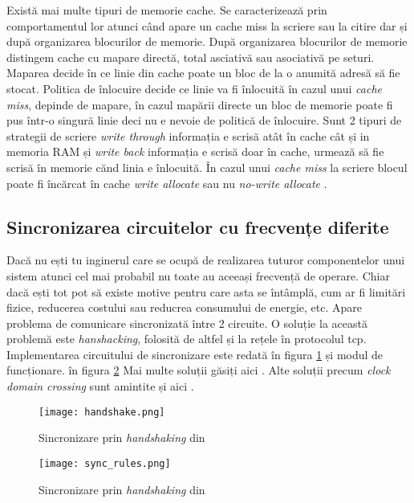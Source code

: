 \documentclass[../main.tex]{subfiles}
\begin{document}
Există mai multe tipuri de memorie cache. Se caracterizează prin comportamentul lor atunci când apare un cache miss la scriere
sau la citire dar și după organizarea blocurilor de memorie. După organizarea blocurilor de memorie distingem cache cu
mapare directă, total asciativă sau asociativă pe seturi. Maparea decide în ce linie din cache poate un bloc de la o anumită 
adresă să fie stocat. Politica de înlocuire decide ce linie va fi înlocuită în cazul unui \emph{cache miss}, depinde de
mapare, în cazul mapării directe un bloc de memorie poate fi pus într-o singură linie deci nu e nevoie de politică de
înlocuire. Sunt 2 tipuri de strategii de scriere \emph{write through} informația e scrisă atât în cache cât și in memoria RAM
și \emph{write back} informația e scrisă doar în cache, urmează să fie scrisă în memorie cănd linia e înlocuită. În cazul unui
\emph{cache miss} la scriere blocul poate fi încărcat în cache \emph{write allocate} sau nu \emph{no-write allocate}
\cite{cache}.

\subsection{Sincronizarea circuitelor cu frecvențe diferite}
Dacă nu ești tu inginerul care se ocupă de realizarea tuturor componentelor unui sistem atunci cel mai probabil nu toate
au aceeași frecvență de operare. Chiar dacă ești tot pot să existe motive pentru care asta se întâmplă, cum ar fi
limitări fizice, reducerea costului sau reducrea consumului de energie, etc. Apare problema de comunicare sincronizată
între 2 circuite. O soluție la această problemă este \emph{hanshacking}, folosită de altfel și la rețele în protocolul
\acrshort{tcp}. Implementarea circuitului de sincronizare este redată în figura \ref{fig:handshake} și modul de funcționare.
în figura \ref{fig:handshake_rules} Mai multe soluții găsiți aici \cite{sync}.
Alte soluții precum \emph{clock domain crossing} sunt amintite și aici \cite{block_memory}.

\begin{figure}[h]
    \centering
    \texttt{[image: handshake.png]}
    \caption{Sincronizare prin \emph{handshaking} din \cite{sync}}
    \label{fig:handshake}
\end{figure}

\begin{figure}[h]
    \centering
    \texttt{[image: sync\_rules.png]}
    \caption{Sincronizare prin \emph{handshaking} din \cite{sync}}
    \label{fig:handshake_rules}
\end{figure}
\end{document}
